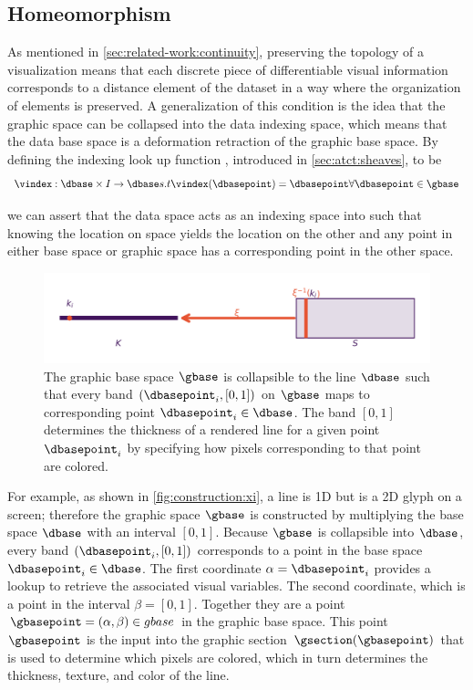 \documentclass[journal]{IEEEtran}
\theoremstyle{definition}
\theoremstyle{remark}
\begin{document}
\subsection{Homeomorphism}
As mentioned in \autoref{sec:related-work:continuity}, preserving the topology of a visualization means that each discrete piece of differentiable visual information corresponds to a distance element of the dataset\cite{ziemkiewiczEmbeddingInformationVisualization2009} in a way where the organization of elements is preserved. A generalization of this condition is the idea that the graphic space can be collapsed into the data indexing space, which means that the data base space is a deformation retraction of the graphic base space\cite{hatcherAlgebraicTopology2002}. By defining the indexing look up function \vindex, introduced in \autoref{sec:atct:sheaves}, to be
\begin{equation}
  \vindex: \dbase \times I \rightarrow \dbase s.t \vindex(\dbasepoint) = \dbasepoint \forall \dbasepoint \in \gbase
\end{equation}

we can assert that the data space \dbase acts as an indexing space into \gbase such that knowing the location on space yields the location on the other and any point in either base space or graphic space has a corresponding point in the other space.
\begin{figure}[H]
  \includegraphics[width=1\columnwidth]{deform_retract.png}
  \caption{The graphic base space $\gbase$ is collapsible to the line $\dbase$ such that every band $(\dbasepoint_i, [0,1])$ on $\gbase$ maps to corresponding point $\dbasepoint_i \in \dbase$. The band $[0,1]$ determines the thickness of a rendered line for a given point $\dbasepoint_{i}$ by specifying how pixels corresponding to that point are colored. \label{fig:construction:xi}}
\end{figure}

For example, as shown in \autoref{fig:construction:xi}, a line is 1D but is a 2D glyph on a screen; therefore the graphic space $\gbase$ is constructed by multiplying the base space $\dbase$ with an interval $[0,1]$. Because $\gbase$ is collapsible into $\dbase$, every band $(\dbasepoint_i, [0,1])$ corresponds to a point in the base space $\dbasepoint_i \in \dbase$. The first coordinate $\alpha=\dbasepoint_i$ provides a lookup to retrieve the associated visual variables. The second coordinate, which is a point in the interval $\beta=[0,1]$. Together they are a point $\gbasepoint=(\alpha,\beta) \in gbase$ in the graphic base space. This point $\gbasepoint$ is the input into the graphic section $\gsection(\gbasepoint)$ that is used to determine which pixels are colored, which in turn determines the thickness, texture, and color of the line.
\end{document}
